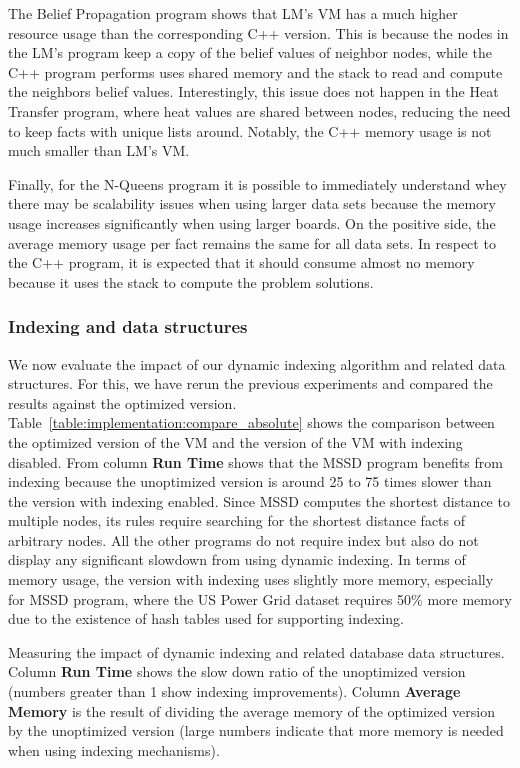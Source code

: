 The Belief Propagation program shows that LM's VM has a much higher resource
usage than the corresponding C++ version. This is because the nodes in the LM's
program keep a copy of the belief values of neighbor nodes, while the C++
program performs uses shared memory and the stack to read and compute the
neighbors belief values. Interestingly, this issue does not happen in the Heat
Transfer program, where heat values are shared between nodes, reducing the need
to keep facts with unique lists around. Notably, the C++ memory usage is not
much smaller than LM's VM.

Finally, for the N-Queens program it is possible to immediately understand whey
there may be scalability issues when using larger data sets because the memory
usage increases significantly when using larger boards. On the positive side,
the average memory usage per fact remains the same for all data sets. In respect
to the C++ program, it is expected that it should consume almost no memory
because it uses the stack to compute the problem solutions.

\subsubsection{Indexing and data structures}

We now evaluate the impact of our dynamic indexing algorithm and related data
structures. For this, we have rerun the previous experiments and compared the
results against the optimized version.
Table~\ref{table:implementation:compare_absolute} shows the comparison between
the optimized version of the VM and the version of the VM with indexing
disabled. From column \textbf{Run Time} shows that the MSSD program benefits
from indexing because the unoptimized version is around 25 to 75 times slower
than the version with indexing enabled. Since MSSD computes the shortest
distance to multiple nodes, its rules require searching for the shortest
distance facts of arbitrary nodes. All the other programs do not require index
but also do not display any significant slowdown from using dynamic indexing. In
terms of memory usage, the version with indexing uses slightly more memory,
especially for MSSD program, where the US Power Grid dataset requires 50\% more
memory due to the existence of hash tables used for supporting indexing.

\begin{table}[ht]
   \begin{center}
      
   \end{center}
   \caption{Measuring the impact of dynamic indexing and related database data
      structures. Column \textbf{Run Time} shows the slow down ratio of the
      unoptimized version (numbers greater than 1 show indexing improvements).
      Column \textbf{Average Memory} is the result of dividing the average
      memory of the optimized version by the unoptimized version (large numbers
      indicate that more memory is needed when using indexing mechanisms).}
   \label{table:implementation:compare_absolute}
\end{table}

